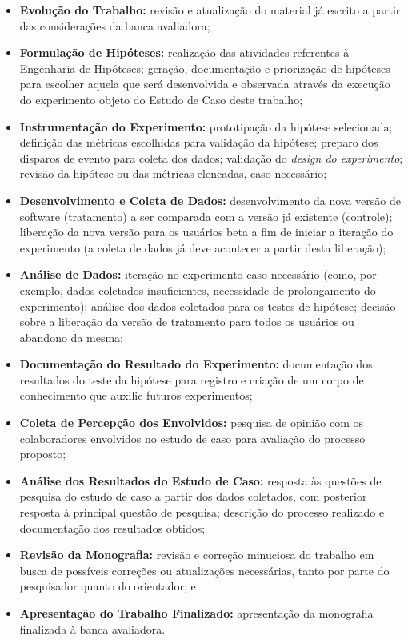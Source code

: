 \begin{itemize}
    \item \textbf{Evolução do Trabalho:} revisão e atualização do material já escrito a partir das considerações da banca avaliadora;
    \item \textbf{Formulação de Hipóteses:} realização das atividades referentes à Engenharia de Hipóteses; geração, documentação e priorização de hipóteses para escolher aquela que será desenvolvida e observada através da execução do experimento objeto do Estudo de Caso deste trabalho;
    \item \textbf{Instrumentação do Experimento:} prototipação da hipótese selecionada; definição das métricas escolhidas para validação da hipótese; preparo dos disparos de evento para coleta dos dados; validação do \textit{design do experimento}; revisão da hipótese ou das métricas elencadas, caso necessário;
    \item \textbf{Desenvolvimento e Coleta de Dados:} desenvolvimento da nova versão de software (tratamento) a ser comparada com a versão já existente (controle); liberação da nova versão para os usuários beta a fim de iniciar a iteração do experimento (a coleta de dados já deve acontecer a partir desta liberação);
    \item \textbf{Análise de Dados:} iteração no experimento caso necessário (como, por exemplo, dados coletados insuficientes, necessidade de prolongamento do experimento); análise dos dados coletados para os testes de hipótese; decisão sobre a liberação da versão de tratamento para todos os usuários ou abandono da mesma;
    \item \textbf{Documentação do Resultado do Experimento:} documentação dos resultados do teste da hipótese para registro e criação de um corpo de conhecimento que auxilie futuros experimentos;
    \item \textbf{Coleta de Percepção dos Envolvidos:} pesquisa de opinião com os colaboradores envolvidos no estudo de caso para avaliação do processo proposto;
    \item \textbf{Análise dos Resultados do Estudo de Caso:} resposta às questões de pesquisa do estudo de caso a partir dos dados coletados, com posterior resposta à principal questão de pesquisa; descrição do processo realizado e documentação dos resultados obtidos;
    \item \textbf{Revisão da Monografia:} revisão e correção minuciosa do trabalho em busca de possíveis correções ou atualizações necessárias, tanto por parte do pesquisador quanto do orientador; e
    \item \textbf{Apresentação do Trabalho Finalizado:} apresentação da monografia finalizada à banca avaliadora.
\end{itemize}



